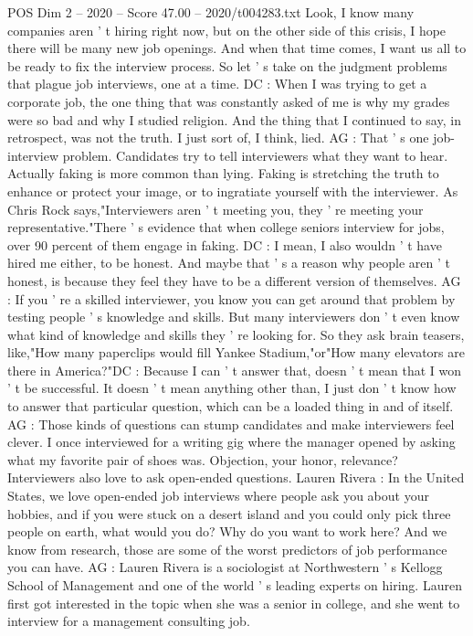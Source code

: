\begin{textsample}{POS Dim 2 – 2020 – Score 47.00 – 2020/t004283.txt}
Look, I know many companies aren ' t hiring right now, but on the other side of this crisis, I hope there will be many new job openings.
And when that time comes, I want us all to be ready to fix the interview process.
So let ' s take on the judgment problems that plague job interviews, one at a time.
DC : When I was trying to get a corporate job, the one thing that was constantly asked of me is why my grades were so bad and why I studied religion.
And the thing that I continued to say, in retrospect, was not the truth.
I just sort of, I think, lied.
AG : That ' s one job-interview problem.
Candidates try to tell interviewers what they want to hear.
Actually faking is more common than lying.
Faking is stretching the truth to enhance or protect your image, or to ingratiate yourself with the interviewer.
As Chris Rock says,"Interviewers aren ' t meeting you, they ' re meeting your representative."There ' s evidence that when college seniors interview for jobs, over 90 percent of them engage in faking.
DC : I mean, I also wouldn ' t have hired me either, to be honest.
And maybe that ' s a reason why people aren ' t honest, is because they feel they have to be a different version of themselves.
AG : If you ' re a skilled interviewer, you know you can get around that problem by testing people ' s knowledge and skills.
But many interviewers don ' t even know what kind of knowledge and skills they ' re looking for.
So they ask brain teasers, like,"How many paperclips would fill Yankee Stadium,"or"How many elevators are there in America?"DC : Because I can ' t answer that, doesn ' t mean that I won ' t be successful.
It doesn ' t mean anything other than, I just don ' t know how to answer that particular question, which can be a loaded thing in and of itself.
AG : Those kinds of questions can stump candidates and make interviewers feel clever.
I once interviewed for a writing gig where the manager opened by asking what my favorite pair of shoes was.
Objection, your honor, relevance?
Interviewers also love to ask open-ended questions.
Lauren Rivera : In the United States, we love open-ended job interviews where people ask you about your hobbies, and if you were stuck on a desert island and you could only pick three people on earth, what would you do?
Why do you want to work here?
And we know from research, those are some of the worst predictors of job performance you can have.
AG : Lauren Rivera is a sociologist at Northwestern ' s Kellogg School of Management and one of the world ' s leading experts on hiring.
Lauren first got interested in the topic when she was a senior in college, and she went to interview for a management consulting job.

\end{textsample}
